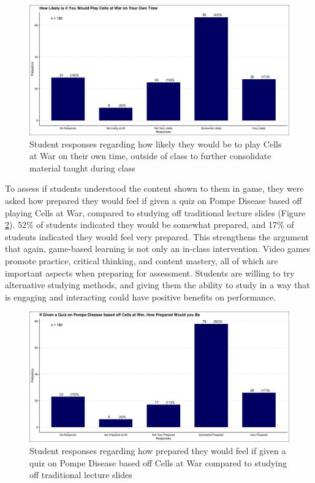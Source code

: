 \documentclass[10pt]{article}
\providecommand{\figref}[1]{(Figure \ref{#1})}  %
\begin{document}
\begin{figure}[H]
	\includegraphics[width=\textwidth]{figures_4f06/how_likely_you_would_play_cellsatwar.jpg}
	\caption{Student responses regarding how likely they would be to play Cells at War on their own time, outside of class to further consolidate material taught during class}
	\label{fig:7}
\end{figure}

To assess if students understood the content shown to them in game, they were asked how prepared they would feel if given a quiz on Pompe Disease based off playing Cells at War, compared to studying off traditional lecture slides \figref{fig:8}. 52\% of students indicated they would be somewhat prepared, and 17\% of students indicated they would feel very prepared. This strengthens the argument that again, game-based learning is not only an in-class intervention. Video games promote practice, critical thinking, and content mastery, all of which are important aspects when preparing for assessment. Students are willing to try alternative studying methods, and giving them the ability to study in a way that is engaging and interacting could have positive benefits on performance.

\begin{figure}[H]
	\includegraphics[width=\textwidth]{figures_4f06/how_prepared_if_tested_on_pompe_based_off_cellsatwar.jpg}
	\caption{Student responses regarding how prepared they would feel if given a quiz on Pompe Disease based off Cells at War compared to studying off traditional lecture slides}
	\label{fig:8}
\end{figure}
\end{document}
